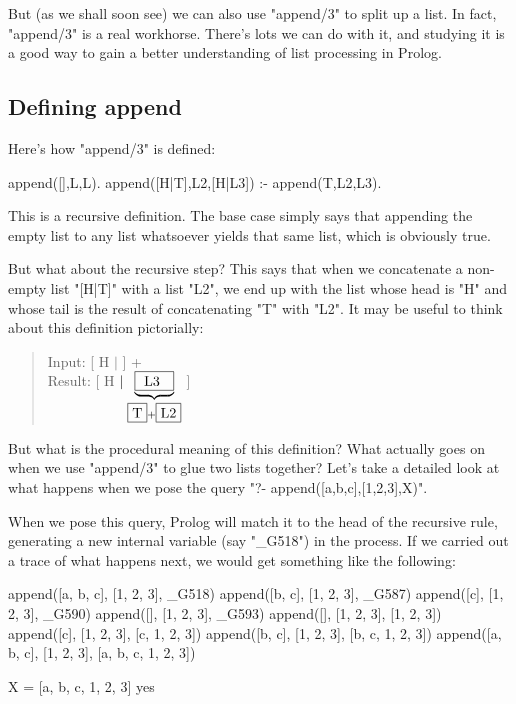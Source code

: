 But (as we shall soon see) we can also use "append/3" to split up a
list.  In fact, "append/3" is a real workhorse.  There's lots we
can do with it, and studying it is a good way to gain a better
understanding of list processing in Prolog.

\subsection*{Defining append}\label{SUBSEC.L6.DEFINING.APPEND}



Here's how "append/3" is defined:
\begin{LPNcodedisplay}
append([],L,L).
append([H|T],L2,[H|L3]) :- append(T,L2,L3).
\end{LPNcodedisplay}

This is a recursive definition. The base case simply says that
appending the empty list to any list whatsoever yields that same list,
which is obviously true.

But what about the recursive step?  This says that when we concatenate
a non-empty list "[H|T]" with a list "L2", we end up with
the list whose head is "H" and whose tail is the result of
concatenating "T" with "L2". It may be useful to think about
this definition pictorially:


\begin{quote}
Input:  [ H $\mid$  ] +  \\[5mm]
Result: [ H $\mid \underbrace{\fbox{\ L3 \ }}_{\fbox{T}+\fbox{L2}}$ ]
\end{quote}








But what is the procedural meaning of this definition?  What actually
goes on when we use "append/3" to glue two lists together?
Let's take a detailed look at what happens when we pose the query
"?- append([a,b,c],[1,2,3],X)".

When we pose this query, Prolog will match it to the
head of the recursive rule, generating a new internal variable
(say "_G518") in the process. If we carried out a trace of what
happens next, we would get something like the following:

\begin{LPNcodedisplay}
append([a, b, c], [1, 2, 3], _G518)
append([b, c], [1, 2, 3], _G587)
append([c], [1, 2, 3], _G590)
append([], [1, 2, 3], _G593)
append([], [1, 2, 3], [1, 2, 3])
append([c], [1, 2, 3], [c, 1, 2, 3])
append([b, c], [1, 2, 3], [b, c, 1, 2, 3])
append([a, b, c], [1, 2, 3], [a, b, c, 1, 2, 3])

X = [a, b, c, 1, 2, 3]
yes
\end{LPNcodedisplay}

